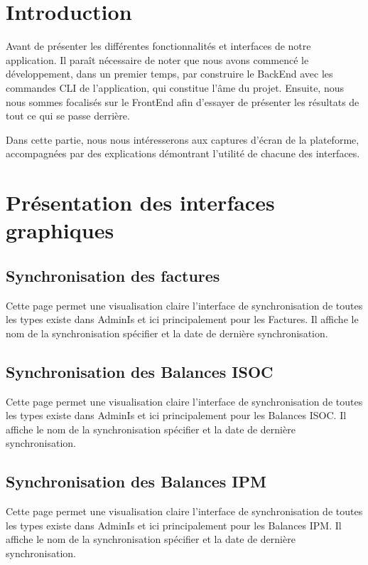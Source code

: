 \section{Introduction}

Avant de présenter les différentes fonctionnalités et interfaces de notre application. Il paraît nécessaire de noter que nous avons commencé le développement, dans un premier temps, par construire le BackEnd avec les commandes CLI de l'application, qui constitue l'âme du projet. Ensuite, nous nous sommes focalisés sur le FrontEnd afin d'essayer de présenter les résultats de tout ce qui se passe derrière.

Dans cette partie, nous nous intéresserons aux captures d'écran de la plateforme, accompagnées par des explications démontrant l'utilité de chacune des interfaces.

\section{Présentation des interfaces graphiques}

\subsection{Synchronisation des factures}

Cette page permet une visualisation claire l'interface de synchronisation de toutes les types existe dans AdminIs et ici principalement pour les Factures. Il affiche le nom de la synchronisation spécifier et la date de dernière synchronisation.

\subsection{Synchronisation des Balances ISOC}

Cette page permet une visualisation claire l'interface de synchronisation de toutes les types existe dans AdminIs et ici principalement pour les Balances ISOC. Il affiche le nom de la synchronisation spécifier et la date de dernière synchronisation.

\subsection{Synchronisation des Balances IPM}

Cette page permet une visualisation claire l'interface de synchronisation de toutes les types existe dans AdminIs et ici principalement pour les Balances IPM. Il affiche le nom de la synchronisation spécifier et la date de dernière synchronisation.


